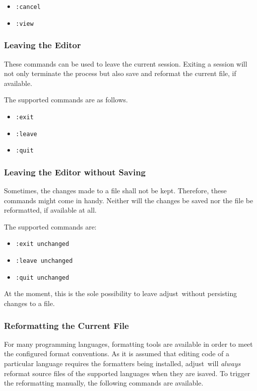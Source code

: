 \documentclass[11pt, a4paper, british]{scrartcl}
\DeclareRobustCommand{\adjust}{\textsf{adjust}}
\begin{document}
\begin{itemize}
\item \texttt{:cancel}
\item \texttt{:view}
\end{itemize}

\subsubsection{Leaving the Editor}
\label{sec:leaving-the-editor}
These commands can be used to leave the current session.  Exiting a session will
not only terminate the process but also save and reformat the current file, if
available.

The supported commands are as follows.

\begin{itemize}
\item \texttt{:exit}
\item \texttt{:leave}
\item \texttt{:quit}
\end{itemize}

\subsubsection{Leaving the Editor without Saving}
\label{sec:leaving-the-editor-without-saving}
Sometimes, the changes made to a file shall not be kept.  Therefore, these
commands might come in handy.  Neither will the changes be saved nor the file be
reformatted, if available at all.

The supported commands are:

\begin{itemize}
\item \texttt{:exit unchanged}
\item \texttt{:leave unchanged}
\item \texttt{:quit unchanged}
\end{itemize}

At the moment, this is the sole possibility to leave \adjust\ without persisting
changes to a file.

\subsubsection{Reformatting the Current File}
\label{sec:reformatting-the-current-file}
For many programming languages, formatting tools are available in order to meet
the configured format conventions.  As it is assumed that editing code of a
particular language requires the formatters being installed, \adjust\ will
\emph{always} reformat source files of the supported languages when they are
isaved.  To trigger the reformatting manually, the following commands are
available.
\end{document}
